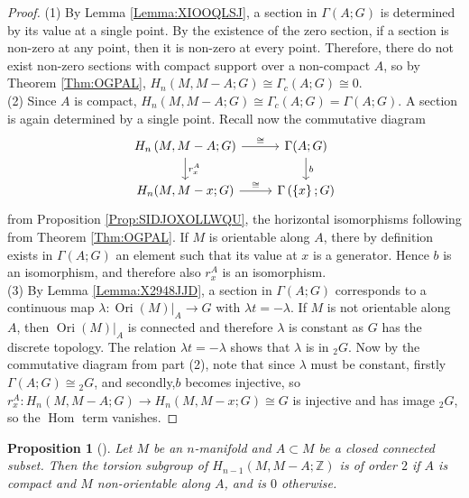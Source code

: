 \documentclass[reqno]{amsart}
\newtheorem{proposition}[theorem]{Proposition}
\theoremstyle{definition}
\theoremstyle{remark}
\DeclareMathOperator{\Hom}{Hom}
\DeclareMathOperator{\Ori}{Ori}
\begin{document}
\begin{proof}
    (1) By Lemma \ref{Lemma:XIOOQLSJ}, a section
    in $\Gamma(A;G)$ is determined by its value at a single
    point. By the existence of the zero section, if
    a section is non-zero at any point, then it is non-zero at
    every point. Therefore, there
    do not exist non-zero sections with compact support
    over a non-compact $A$, so by Theorem \ref{Thm:OGPAL},
    $H_n(M, M-A; G) \cong \Gamma_c (A; G) \cong 0$.\\
    \linebreak
    (2) Since $A$ is compact, 
    $H_n\left( M, M-A; G \right) \cong
    \Gamma_c \left( A;G \right) =
    \Gamma \left( A;G \right) $. A section is again
    determined by a single point. Recall now the commutative
    diagram
    \begin{equation*}
    \begin{tikzcd}
        H_n \left( M, M-A;G \right) \ar[r, "\cong"] 
        \ar[d, "r_x^{A}"] & \Gamma(A;G) \ar[d, "b"] \\
        H_n(M, M-x;G) \ar[r, "\cong"] & 
        \Gamma \left( \left\{ x \right\} ;G \right) 
    \end{tikzcd}
    \end{equation*}
    from Proposition \ref{Prop:SIDJOXOLLWQU}, the horizontal
    isomorphisms following from Theorem \ref{Thm:OGPAL}.
    If $M$ is orientable along $A$, there by definition
    exists in $\Gamma(A;G)$ an element such that
    its value at $x$ is a generator.
    Hence $b$ is an isomorphism, and therefore
    also $r_x^{A}$ is an isomorphism.\\
    \linebreak
    (3) 
    By Lemma \ref{Lemma:X2948JJD}, 
    a section in $\Gamma(A;G)$ corresponds to a continuous
    map $\lambda \colon \Ori (M) |_{A} \to G$ with
    $\lambda t = - \lambda$.
    If $M$ is not orientable along $A$, then
    $\Ori(M)|_{A}$ is connected and
    therefore $\lambda$ is constant as
    $G$ has the discrete topology. The relation
    $\lambda t = - \lambda$ shows that
    $\lambda$ is in ${}_{2}G$. 
    Now by the commutative diagram from part (2), note that
    since $\lambda$ must be constant, firstly
    $\Gamma (A;G) \cong {}_{2}G$, and
    secondly,$b$ becomes
    injective, so
    $r_{x}^{A} \colon H_n(M,M-A;G) \to 
    H_n \left( M, M- x ; G \right) \cong G$ is injective and
    has image ${}_{2}G$, so the
    $\Hom$ term vanishes.
\end{proof}

\begin{proposition}[]
    Let $M$ be an $n$-manifold and $A \subset M$ be a closed
    connected subset. Then the torsion subgroup
    of $H_{n-1}(M, M-A; \mathbb{Z})$ is of order $2$ if
    $A$ is compact and $M$ non-orientable along
    $A$, and is $0$ otherwise.
\end{proposition}
\end{document}
